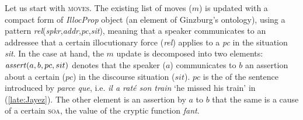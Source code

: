 \documentclass[output=paper,colorlinks,citecolor=brown]{langscibook}
\begin{document}
\ea \label{pcq-pc-move:Jayez}
\avm[attributes=\scshape,values=\upshape]{
			[
			spkr & $a$\\
			addr & $b$\\
			cmt & $sit \models pc \wedge \exists x !(! x : \textbf{pc} \wedge \textit{fant}_\text{pc}!(!b,m,pc,\textit{parce que}!)! =$\\
			& $\textit{fant}_\text{pc}!(!a,m,pc,\textit{parce que}!)! = x \wedge cause!(!pc,x!)!!)! \oplus c$\\
			qud & $sit \models pc \wedge \textit{cause}\mbox{!(!}pc,\textit{fant}_\text{\textbf{pc}}\mbox{!(!}a,m,pc,\textit{parce que}\mbox{!)!!)!} \oplus q$\\
			moves & $\mbox{\textit{assert}!(!}a,b,cause\mbox{!(!}pc,\textit{fant}_\text{\textbf{pc}}\mbox{!(!}a,m,pc,\textit{parce que}\mbox{!)!!)!},sit\mbox{!)!} \oplus \phantom{x}$\\
			& $!(!\mbox{\textit{assert}!(!}a,b,pc,sit\mbox{!)!} \oplus m!)!$
			]
		}
        \z



Let us start with \textsc{moves}. The existing list of moves ($m$) is updated with
a compact form of \textit{IllocProp} object (an element of Ginzburg's ontology), using a pattern \textit{rel}(\textit{spkr},\textit{addr},\textit{pc},\textit{sit}), meaning that a speaker communicates to an addressee that a certain illocutionary force (\textit{rel}) applies to a  \textit{pc} in the situation \textit{sit}. In the case at hand, the $m$ update is decomposed into two elements: $\mbox{\textit{assert}}(a,b,pc,sit)$ denotes that the speaker ($a$) communicates to $b$ an assertion about a certain  ($pc$) in the discourse situation ($sit$). $pc$ is the  of the sentence introduced by \textit{parce que}, i.e. \textit{il a raté son train} `he missed his train' in (\ref{late:Jayez}). The other element is an assertion by $a$ to $b$ that the same  is a cause of a certain \textsc{soa}, the value of the cryptic function \textit{fant}.
\end{document}
